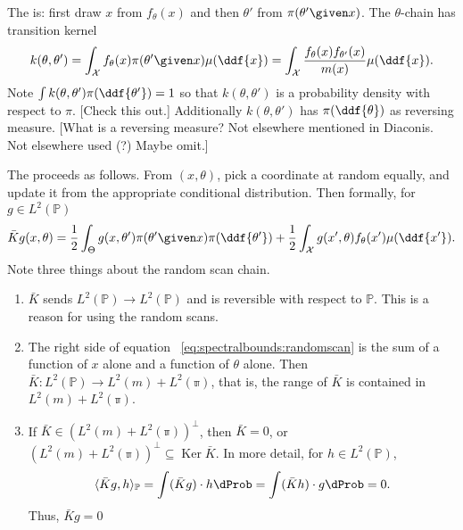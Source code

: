 \documentclass[12pt]{article}
\begin{document}
The %
is:  first draw \( x \) from \( f_{\theta} (x) \) and then \( \theta' \)
from \( \pi(\theta' \given x) \).  The \( \theta \)-chain has transition
kernel
\[
    k(\theta,\theta') = \int_{\mathcal{X}} f_{\theta}(x) \pi(\theta'
    \given x) \mu (\ddf{x}) = \int_{\mathcal{X}} \frac{f_{\theta}(x) f_{\theta'}
    (x)}{m(x)} \mu(\ddf{x}).
\] Note \( \int k(\theta,\theta') \pi(\ddf{\theta'}) = 1 \) so that \( k
(\theta,\theta') \) is a probability density with respect to \( \pi \).
[Check this out.] Additionally \( k(\theta, \theta') \) has \( \pi(\ddf{\theta})
\) as reversing measure.  [What is a reversing measure?  Not elsewhere
mentioned in Diaconis.  Not elsewhere used (?) Maybe omit.]

The %
proceeds as follows.  From \( (x, \theta) \), pick a coordinate at
random equally, and update it from the appropriate conditional
distribution.  Then formally, for \( g \in L^2(\mathbb{P}) \)
\begin{equation}
    \bar{K} g(x,\theta) = \frac{1}{2} \int_{\Theta} g(x,\theta') \pi(\theta'
    \given x) \pi(\ddf{\theta'}) + \frac{1}{2} \int_{\mathcal{X}} g(x',
    \theta) f_{\theta}(x') \mu(\ddf {x'}).%
    \label{eq:spectralbounds:randomscan}
\end{equation}
Note three things about the random scan chain.
\begin{enumerate}
    \item
        \( \bar{K} \) sends \( L^2(\mathbb{P}) \to L^2(\mathbb{P}) \)
        and is reversible with respect to \( \mathbb{P} \).  This is a
        reason for using the random scans.
    \item
        The right side of equation~%
        \ref{eq:spectralbounds:randomscan} is the sum of a function of \(
        x \) alone and a function of \( \theta \) alone.  Then \( \bar{K}:
        L^2(\mathbb{P}) \to L^2(m) + L^2(\mathbb{\pi}) \), that is, the
        range of \( \bar{K} \) is contained in \( L^2(m) + L^2(\mathbb{\pi})
        \).
    \item
        If \( \bar{K} \in (L^2(m) + L^2(\mathbb{\pi}))^{\perp} \), then \(
        \bar{K} = 0 \), or \( (L^2(m) + L^2(\mathbb{\pi}))^ {\perp}
        \subseteq
        \operatorname{Ker}
        {\bar{K}} \).  In more detail, for \( h \in L^2(\mathbb{P}) \),
        \[
            \langle \bar{K}g, h \rangle_{\mathbb{P}} = \int (\bar{K}g)
            \cdot h \dProb = \int (\bar{K}h) \cdot g \dProb = 0.
        \] Thus, \( \bar{K} g = 0 \)
\end{enumerate}
\end{document}
